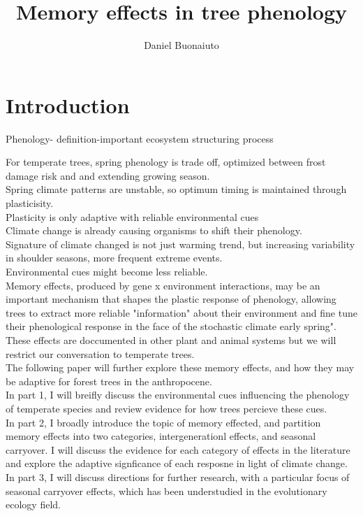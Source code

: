 \documentclass{article}\usepackage[]{graphicx}\usepackage[]{color}
\begin{document}
\title{Memory effects in tree phenology}
\author{Daniel Buonaiuto}
\data{\today}

\section*{Introduction}
Phenology- definition-important ecosystem structuring process
\par
For temperate trees, spring phenology is trade off, optimized between frost damage risk and and extending growing season.\\
Spring climate patterns are unstable, so optimum timing is maintained through plasticisity.\\
Plasticity is only adaptive with reliable environmental cues\\
Climate change is already causing organisms to shift their phenology.\\
Signature of climate changed is not just warming trend, but increasing variability in shoulder seasons, more frequent extreme events.\\
Environmental cues might become less reliable.\\
Memory effects, produced by gene x environment interactions, may be an important mechanism that shapes the plastic response of phenology, allowing trees to extract more reliable "information" about their environment and fine tune their phenological response in the face of the stochastic climate early spring". These effects are doccumented in other plant and animal systems but we will restrict our conversation to temperate trees.\\
The following paper will further explore these memory effects, and how they may be adaptive for forest trees in the anthropocene.\\
In part 1, I will breifly discuss the environmental cues influencing the phenology of temperate species and review evidence for how trees percieve these cues.\\
In part 2, I broadly introduce the topic of memory effected, and partition memory effects into two categories, intergenerationl effects, and seasonal carryover. I will discuss the evidence for each category of effects in the literature and explore the adaptive signficance of each resposne in light of climate change.\\
In part 3, I will discuss directions for further research, with a particular focus of seasonal carryover effects, which has been understudied in the evolutionary ecology field.\\
\end{document}
